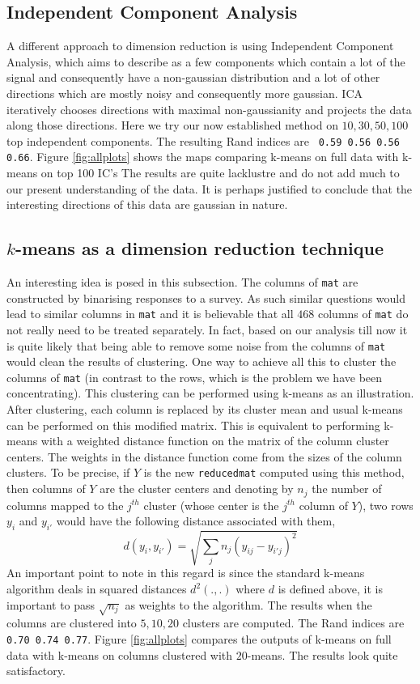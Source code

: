 \subsection{Independent Component Analysis}

A different approach to dimension reduction is using Independent Component Analysis, which aims to describe as a few components which contain a lot of the signal and consequently have a non-gaussian distribution and a lot of other directions which are mostly noisy and consequently more gaussian. ICA iteratively chooses directions with maximal non-gaussianity and projects the data along those directions. Here we try our now established method on $10, 30, 50, 100$ top independent components. The resulting Rand indices are \verb| 0.59 0.56 0.56 0.66|. Figure \ref{fig:allplots} shows the maps comparing k-means on full data with k-means on top 100 IC's
The results are quite lacklustre and do not add much to our present understanding of the data. It is perhaps justified to conclude that the interesting directions of this data are gaussian in nature.

\subsection{$k$-means as a dimension reduction technique}

An interesting idea is posed in this subsection. The columns of \verb|mat| are constructed by binarising responses to a survey. As such similar questions would lead to similar columns in \verb|mat| and it is believable that all $468$ columns of \verb|mat| do not really need to be treated separately. In fact, based on our analysis till now it is quite likely that being able to remove some noise from the columns of \verb|mat| would clean the results of clustering. One way to achieve all this to cluster the columns of \verb|mat| (in contrast to the rows, which is the problem we have been concentrating). This clustering can be performed using k-means as an illustration. After clustering, each column is replaced by its cluster mean and usual k-means can be performed on this modified matrix. This is equivalent to performing k-means with a weighted distance function on the matrix of the column cluster centers. The weights in the distance function come from the sizes of the column clusters. To be precise, if $Y$ is the new \verb|reducedmat| computed using this method, then columns of $Y$ are the cluster centers and denoting by $n_j$ the number of columns mapped to the $j^{th}$ cluster (whose center is the $j^{th}$ column of $Y$), two rows $y_i$ and $y_{i'}$ would have the following distance associated with them,
$$
d(y_i,y_{i'}) = \sqrt{\sum_j n_j (y_{ij}-y_{i'j})^2}
$$
An important point to note in this regard is since the standard k-means algorithm deals in squared distances $d^2(.,.)$ where $d$ is defined above, it is important to pass $\sqrt{n_j}$ as weights to the algorithm. The results when the columns are clustered into $5,10,20$ clusters are computed. The Rand indices are \verb|0.70 0.74 0.77|. Figure \ref{fig:allplots} compares the outputs of k-means on full data with k-means on columns clustered with $20$-means. The results look quite satisfactory.

